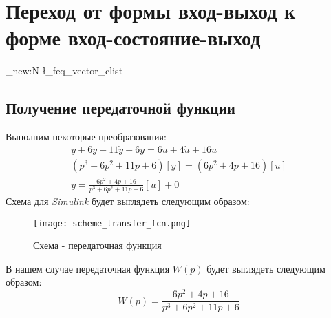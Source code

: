 \chapter{Переход от формы вход-выход к форме вход-состояние-выход}
\label{ch:chap2}

\ExplSyntaxOn
\clist_new:N \l_feq_vector_clist
\ExplSyntaxOff



\lstset{style=mystyle}

\section{Получение передаточной функции}
Выполним некоторые преобразования:
$$
\begin{aligned}
    \dddot{y} + 6\ddot{y} + 11\dot{y} + 6y = 6\ddot{u} + 4\dot{u} + 16u \\
	(p^3 + 6p^2 + 11p + 6)[y] = (6p^2 + 4p + 16)[u] \\
	y = \frac{6p^2 + 4p + 16}{p^3 + 6p^2 + 11p + 6}[u] + 0
\end{aligned}
$$
Схема для \textit{Simulink} будет выглядеть следующим образом:
\begin{figure}[ht]
    \centering
    \texttt{[image: scheme\_transfer\_fcn.png]}
	\caption{Схема - передаточная функция}
\end{figure}

В нашем случае передаточная функция $W(p)$ будет выглядеть следующим образом:
$$
W(p) = \frac{6p^2 + 4p + 16}{p^3 + 6p^2 + 11p + 6}
$$
